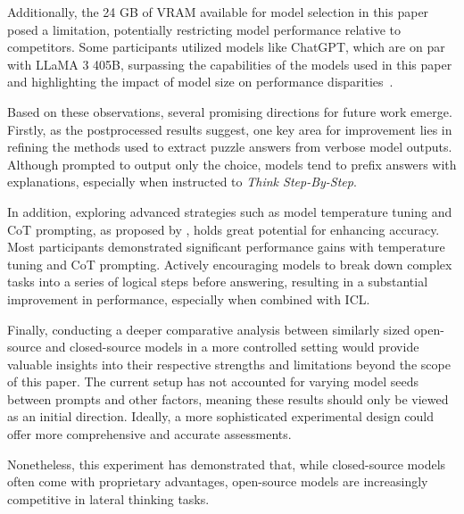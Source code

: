 Additionally, the 24 GB of \ac{VRAM} available for model selection in this paper posed a limitation, potentially restricting model performance relative to competitors. Some participants utilized models like ChatGPT, which are on par with LLaMA 3 405B, surpassing the capabilities of the models used in this paper and highlighting the impact of model size on performance disparities~\cite{grattafioriLlama3Herd2024, openaiGPT4TechnicalReport2024}.

Based on these observations, several promising directions for future work emerge. Firstly, as the postprocessed results suggest, one key area for improvement lies in refining the methods used to extract puzzle answers from verbose model outputs. Although prompted to output only the choice, models tend to prefix answers with explanations, especially when instructed to \textit{Think Step-By-Step}.

In addition, exploring advanced strategies such as model temperature tuning and \ac{CoT} prompting, as proposed by \textcite{weiChainofThoughtPromptingElicits2023}, holds great potential for enhancing accuracy. Most participants demonstrated significant performance gains with temperature tuning and \ac{CoT} prompting. Actively encouraging models to break down complex tasks into a series of logical steps before answering, resulting in a substantial improvement in performance, especially when combined with \ac{ICL}.

Finally, conducting a deeper comparative analysis between similarly sized open-source and closed-source models in a more controlled setting would provide valuable insights into their respective strengths and limitations beyond the scope of this paper. The current setup has not accounted for varying model seeds between prompts and other factors, meaning these results should only be viewed as an initial direction. Ideally, a more sophisticated experimental design could offer more comprehensive and accurate assessments.

Nonetheless, this experiment has demonstrated that, while closed-source models often come with proprietary advantages, open-source models are increasingly competitive in lateral thinking tasks.
